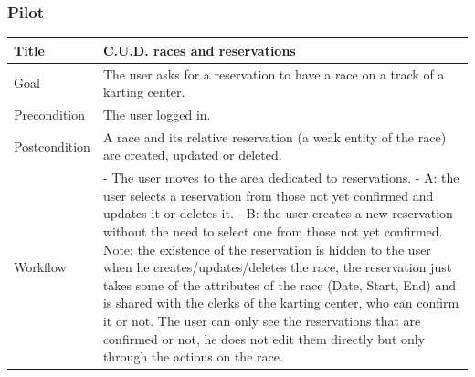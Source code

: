 \documentclass{beamer}
\begin{document}
\begin{frame}
    \frametitle{Pilot}
    \begin{table}
        \tiny
        \begin{tabular}{|p{2cm}|p{6cm}|}
        \hline
        Title & \textbf{C.U.D. races and reservations} \\
        \hline
        Goal & The user asks for a reservation to have a race on a track of a karting center. \\
        \hline
        Precondition & The user logged in. \\
        \hline
        Postcondition & A race and its relative reservation (a weak entity of the race) are created, updated or deleted. \\
        \hline
        Workflow &
        - The user moves to the area dedicated to reservations. \newline
        - A: the user selects a reservation from those not yet confirmed and updates it or deletes it. \newline
        - B: the user creates a new reservation without the need to select one from those not yet confirmed. \newline
        Note: the existence of the reservation is hidden to the user when he creates/updates/deletes the race,
        the reservation just takes some of the attributes of the race (Date, Start, End) and is shared with the clerks
        of the karting center, who can confirm it or not. The user can only see the reservations that are
        confirmed or not, he does not edit them directly but only through the actions on the race. \\
        \hline
        \end{tabular}
\end{table}
\end{frame}
\end{document}
